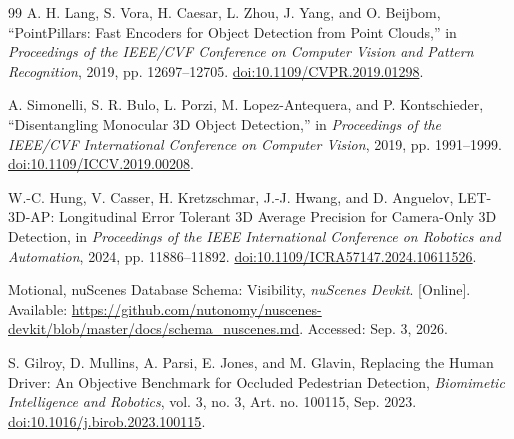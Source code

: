 \begin{thebibliography}{99}
\label{bib_ref_28} A. H. Lang, S. Vora, H. Caesar, L. Zhou, J. Yang, and O. Beijbom, ``PointPillars: Fast Encoders for Object Detection from Point Clouds,'' in \emph{Proceedings of the IEEE/CVF Conference on Computer Vision and Pattern Recognition}, 2019, pp. 12697--12705. \href{https://doi.org/10.1109/CVPR.2019.01298}{doi:10.1109/CVPR.2019.01298}.


\label{bib_ref_29} A. Simonelli, S. R. Bulo, L. Porzi, M. Lopez-Antequera, and P. Kontschieder, ``Disentangling Monocular 3D Object Detection,'' in \emph{Proceedings of the IEEE/CVF International Conference on Computer Vision}, 2019, pp. 1991--1999. \href{https://doi.org/10.1109/ICCV.2019.00208}{doi:10.1109/ICCV.2019.00208}.


\label{bib_ref_30} W.-C. Hung, V. Casser, H. Kretzschmar, J.-J. Hwang, and D. Anguelov, {LET-3D-AP: Longitudinal Error Tolerant 3D Average Precision for Camera-Only 3D Detection}, in \emph{Proceedings of the IEEE International Conference on Robotics and Automation}, 2024, pp. 11886--11892. \href{https://doi.org/10.1109/ICRA57147.2024.10611526}{doi:10.1109/ICRA57147.2024.10611526}.


\label{bib_ref_31} Motional, {nuScenes Database Schema: Visibility}, \emph{nuScenes Devkit}. [Online]. Available: \url{https://github.com/nutonomy/nuscenes-devkit/blob/master/docs/schema_nuscenes.md}. Accessed: Sep. 3, 2026.


\label{bib_ref_32} S. Gilroy, D. Mullins, A. Parsi, E. Jones, and M. Glavin, {Replacing the Human Driver: An Objective Benchmark for Occluded Pedestrian Detection}, \emph{Biomimetic Intelligence and Robotics}, vol. 3, no. 3, Art. no. 100115, Sep. 2023. \href{https://doi.org/10.1016/j.birob.2023.100115}{doi:10.1016/j.birob.2023.100115}.

\end{thebibliography}
